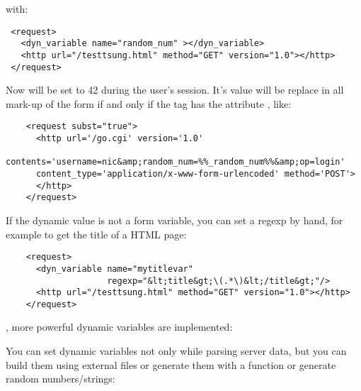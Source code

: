\documentclass{TSUNG-en}
\begin{document}
with:
\begin{Verbatim}
 <request>
   <dyn_variable name="random_num" ></dyn_variable>
   <http url="/testtsung.html" method="GET" version="1.0"></http>
 </request>
\end{Verbatim}

Now  will be set to 42 during the user's session. It's
value will be replace in all mark-up of the form
 if and only if the  tag has the
attribute , like:

\begin{Verbatim}
    <request subst="true">
      <http url='/go.cgi' version='1.0'
      contents='username=nic&amp;random_num=%%_random_num%%&amp;op=login'
      content_type='application/x-www-form-urlencoded' method='POST'>
      </http>
    </request>
\end{Verbatim}

If the dynamic value is not a form variable, you can set a regexp by
hand, for example to get the title of a HTML page:
\begin{Verbatim}
    <request>
      <dyn_variable name="mytitlevar"
                    regexp="&lt;title&gt;\(.*\)&lt;/title&gt;"/>
      <http url="/testtsung.html" method="GET" version="1.0"></http>
    </request>
\end{Verbatim}

, more powerful dynamic variables are implemented:

You can set dynamic variables not only while parsing server data, but
you can build them using external files or generate them with a function
or generate random numbers/strings:
\end{document}
